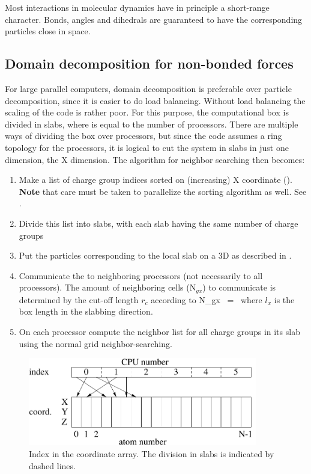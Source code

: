 Most interactions in molecular dynamics have in principle a
short-range character.  Bonds, angles and dihedrals are guaranteed to
have the corresponding particles close in space.


\subsection{Domain decomposition for non-bonded forces}
For large parallel computers, domain decomposition is preferable over
particle decomposition, since it is easier to do load
balancing. Without load balancing the scaling of the code is rather
poor. For this purpose, the computational box is divided in {\nproc}
slabs, where {\nproc} is equal to the number of processors. There are
multiple ways of dividing the box over processors, but since the
{\gromacs} code assumes a ring topology for the processors, it is
logical to cut the system in slabs in just one dimension, the X
dimension.  The algorithm for neighbor searching then becomes:
\begin{enumerate}
\item   Make a list of charge group indices sorted on (increasing) X coordinate
        ().
        {\bf Note} that care must be taken to parallelize the sorting algorithm
        as well. See .
\item   Divide this list into slabs, with each slab having the same number of
        charge groups
\item   Put the particles corresponding to the local slab on a 3D {\nsgrid} as 
        described in .
\item   Communicate the {\nsgrid} to neighboring processors (not necessarily to all
        processors). The amount of neighboring {\nsgrid} cells (N$_{gx}$) to 
        communicate is determined by the cut-off length $r_c$ according to
        \beq
        N_{gx}  ~=~        
        \eeq
        where $l_x$ is the box length in the slabbing direction. 
\item   On each processor compute the neighbor list for all charge groups in
        its slab using the normal grid neighbor-searching.
\end{enumerate}

\begin{figure}
\centerline{\includegraphics[width=10cm]{plots/parsort}}
\caption[Index in the coordinate array.]{Index in the coordinate
array. The division in slabs is indicated by dashed lines.}
\label{fig:parsort}
\end{figure}

